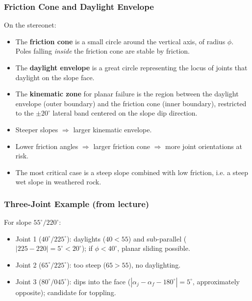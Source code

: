\documentclass[a4paper,12pt]{article}
\begin{document}
\subsubsection{Friction Cone and Daylight Envelope}
On the stereonet:
\begin{itemize}[nosep]
    \item The \textbf{friction cone} is a small circle around the vertical axis, of radius $\phi$. Poles falling \emph{inside} the friction cone are stable by friction.
    \item The \textbf{daylight envelope} is a great circle representing the locus of joints that daylight on the slope face.
    \item The \textbf{kinematic zone} for planar failure is the region between the daylight envelope (outer boundary) and the friction cone (inner boundary), restricted to the $\pm 20^\circ$ lateral band centered on the slope dip direction.
\end{itemize}

\begin{notebox}
\begin{itemize}[nosep]
    \item Steeper slopes $\Rightarrow$ larger kinematic envelope.
    \item Lower friction angles $\Rightarrow$ larger friction cone $\Rightarrow$ more joint orientations at risk.
    \item The most critical case is a steep slope combined with low friction, i.e. a steep wet slope in weathered rock.
\end{itemize}
\end{notebox}

\subsubsection{Three-Joint Example (from lecture)}
For slope $55^\circ/220^\circ$:
\begin{itemize}[nosep]
    \item Joint 1 ($40^\circ/225^\circ$): daylights ($40 < 55$) and sub-parallel ($|225-220| = 5^\circ < 20^\circ$); if $\phi < 40^\circ$, planar sliding possible.
    \item Joint 2 ($65^\circ/225^\circ$): too steep ($65 > 55$), no daylighting.
    \item Joint 3 ($80^\circ/045^\circ$): dips into the face ($|\alpha_j - \alpha_f - 180^\circ| = 5^\circ$, approximately opposite); candidate for toppling.
\end{itemize}
\end{document}
